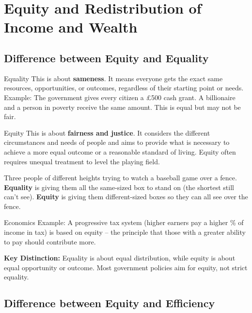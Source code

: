 \documentclass[11pt, a4paper, twoside]{book}
\begin{document}
\section{Equity and Redistribution of Income and Wealth}

\subsection{Difference between Equity and Equality}

\begin{keyterm}{Equality}
This is about \textbf{sameness}. It means everyone gets the exact same resources, opportunities, or outcomes, regardless of their starting point or needs. Example: The government gives every citizen a £500 cash grant. A billionaire and a person in poverty receive the same amount. This is equal but may not be fair.
\end{keyterm}

\begin{keyterm}{Equity}
This is about \textbf{fairness and justice}. It considers the different circumstances and needs of people and aims to provide what is necessary to achieve a more equal outcome or a reasonable standard of living. Equity often requires unequal treatment to level the playing field.
\end{keyterm}

\begin{example}
Three people of different heights trying to watch a baseball game over a fence. \textbf{Equality} is giving them all the same-sized box to stand on (the shortest still can't see). \textbf{Equity} is giving them different-sized boxes so they can all see over the fence.
\end{example}

Economics Example: A progressive tax system (higher earners pay a higher \% of income in tax) is based on equity -- the principle that those with a greater ability to pay should contribute more.

\begin{coreidea}
\textbf{Key Distinction:} Equality is about equal distribution, while equity is about equal opportunity or outcome. Most government policies aim for equity, not strict equality.
\end{coreidea}

\subsection{Difference between Equity and Efficiency}
\end{document}
